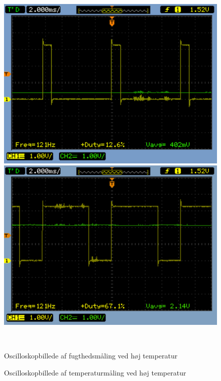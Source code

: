 \begin{figure}[H] \centering
\begin{minipage}[b]{0.48\textwidth} \centering
\includegraphics[width=1.00\textwidth]{filer/modultest/Billeder/SCOP_humidVARM} %
\end{minipage} \hfill
\begin{minipage}[b]{0.48\textwidth} \centering
\includegraphics[width=1.00\textwidth]{filer/modultest/Billeder/SCOP_tempVARM} %
\end{minipage} \\ %
\begin{minipage}[t]{0.48\textwidth}
\caption{Oscilloskopbillede af fugthedsmåling ved høj temperatur} %
\label{fig:SCOP_FUGT_VARM}
\end{minipage} \hfill
\begin{minipage}[t]{0.48\textwidth}
\caption{Oscilloskopbillede af temperaturmåling ved høj temperatur} %
\label{fig:SCOP_TEMP_VARM}
\end{minipage}
\end{figure}

